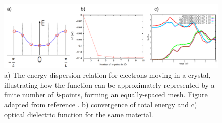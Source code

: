 \documentclass[11pt, twoside]{report}
\begin{document}
\begin{figure}[h!]
  \centering
    \includegraphics[width=1.0\textwidth]{figures/k_sampling_full.png}
    \caption{a) The energy dispersion relation for electrons moving in a crystal, illustrating how the function can be approximately represented by a finite number of \textit{k}-points, forming an equally-spaced mesh. Figure adapted from reference . b) convergence of total energy and c) optical dielectric function for the same material.}
  \label{k_sampling}
\end{figure}
\end{document}
